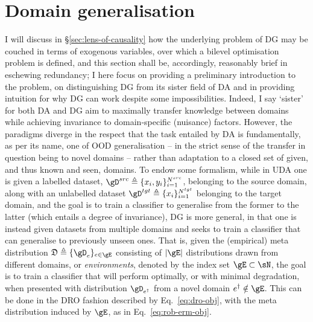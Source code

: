 \section{Domain generalisation}\label{sec:dg}
I will discuss in \S\ref{sec:lens-of-causality} how the underlying problem of \ac{DG} may be
couched in terms of exogenous variables, over which a bilevel optimisation problem is defined, and
this section shall be, accordingly, reasonably brief in eschewing redundancy; I here focus on
providing a preliminary introduction to the problem, on distinguishing \ac{DG} from its sister
field of \ac{DA} and in providing intuition for why \ac{DG} can work despite some impossibilities.
%
Indeed, I say `sister' for both \ac{DA} and \ac{DG} aim to maximally transfer knowledge between
domains while achieving invariance to domain-specific (nuisance) factors. 
%
However, the paradigms diverge in the respect that the task entailed by \ac{DA} is fundamentally,
as per its name, one of \ac{OOD} generalisation -- in the strict sense of the transfer in question
being to novel domains -- rather than adaptation to a closed set of given, and thus known and seen,
domains.
%
%
To endow some formalism, while in \ac{UDA} one is given a labelled dataset, \( \gD^{src} \triangleq
\{x_i, y_i \}_{i=1}^{N^{src}} \), belonging to the source domain, along with an unlabelled dataset
\( \gD^{tgt} \triangleq \{ x_i \}_{i=1}^{N^{tgt}} \) belonging to the target domain, and the goal
is to train a classifier to generalise from the former to the latter (which entails a degree of
invariance), \ac{DG} is more general, in that one is instead given datasets from multiple domains
and seeks to train a classifier that can generalise to previously unseen ones. 
%
That is, given the (empirical) meta distribution \( \mathfrak{D} \triangleq \{\gD_e \}_{e \in \gE}
\) consisting of \( |\gE| \) distributions drawn from different domains, or \emph{environments},
denoted by the index set \( \gE \subset \sN \), the goal is to train a classifier that will perform
optimally, or with minimal degradation, when presented with distribution \( \gD_{e^\dagger} \) from
a novel domain \( e^\dagger \notin  \gE \).
%
This can be done in the \ac{DRO} fashion described by Eq.~\ref{eq:dro-obj}, with the meta
distribution induced by \(\gE\), as in Eq.~\ref{eq:rob-erm-obj}.

